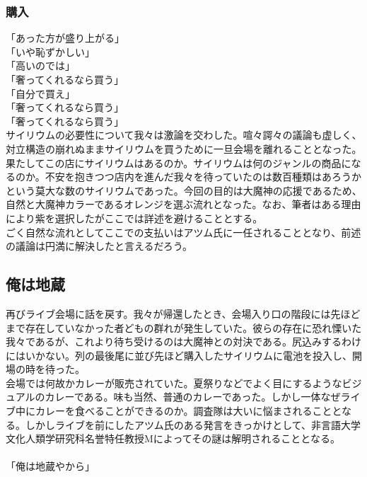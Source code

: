 \subsubsection{購入}

\noindent「あった方が盛り上がる」\\「いや恥ずかしい」\\「高いのでは」\\「奢ってくれるなら買う」\\「自分で買え」\\「奢ってくれるなら買う」\\「奢ってくれるなら買う」\\サイリウムの必要性について我々は激論を交わした。喧々諤々の議論も虚しく、対立構造の崩れぬままサイリウムを買うために一旦会場を離れることとなった。\\
果たしてこの店にサイリウムはあるのか。サイリウムは何のジャンルの商品になるのか。不安を抱きつつ店内を進んだ我々を待っていたのは数百種類はあろうかという莫大な数のサイリウムであった。今回の目的は大魔神の応援であるため、自然と大魔神カラーであるオレンジを選ぶ流れとなった。なお、筆者はある理由により紫を選択したがここでは詳述を避けることとする。\\
ごく自然な流れとしてここでの支払いはアツム氏に一任されることとなり、前述の議論は円満に解決したと言えるだろう。

\subsection{俺は地蔵}

再びライブ会場に話を戻す。我々が帰還したとき、会場入り口の階段には先ほどまで存在していなかった者どもの群れが発生していた。彼らの存在に恐れ慄いた我々であるが、これより待ち受けるのは大魔神との対決である。尻込みするわけにはいかない。列の最後尾に並び先ほど購入したサイリウムに電池を投入し、開場の時を待った。\\
会場では何故かカレーが販売されていた。夏祭りなどでよく目にするようなビジュアルのカレーである。味も当然、普通のカレーであった。しかし一体なぜライブ中にカレーを食べることができるのか。調査隊は大いに悩まされることとなる。しかしライブを前にしたアツム氏のある発言をきっかけとして、非言語大学文化人類学研究科名誉特任教授Mによってその謎は解明されることとなる。\\
\\
{\Large「俺は地蔵やから」\\}
\\

